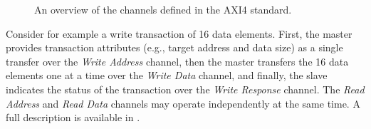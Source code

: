 \documentclass[runningheads]{llncs}
\begin{document}
\begin{figure}[t]
  \centering
  \hfill
  \label{fig:axi4}
  \caption{An overview of the channels defined in the AXI4 standard.}
\end{figure}


Consider for example a write transaction of 16 data elements. First, the master provides transaction attributes (e.g., target address and data size) as a single transfer over the \textit{Write Address} channel, then the master transfers the 16 data elements one at a time over the \textit{Write Data} channel, and finally, the slave indicates the status of the transaction over the \textit{Write Response} channel. The \textit{Read Address} and \textit{Read Data} channels may operate independently at the same time. A full description is available in \cite{axi4standard}.
\end{document}
